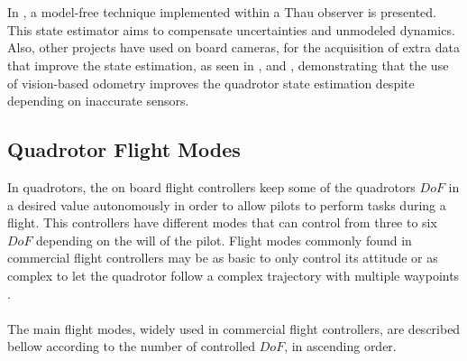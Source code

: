 \\\\
In \cite{AlYounes2015}, a model-free technique implemented within a Thau observer is presented. This state estimator aims to compensate uncertainties and unmodeled dynamics. Also, other projects have used on board cameras, for the acquisition of extra data that improve the state estimation, as seen in \cite{Xie2016}, \cite{Yu2017} and \cite{Liu2017}, demonstrating that the use of vision-based odometry improves the quadrotor state estimation despite depending on inaccurate sensors.

\subsection{Quadrotor Flight Modes}
In quadrotors, the on board flight controllers keep some of the quadrotors $DoF$ in a desired value autonomously in order to allow pilots to perform tasks during a flight. This controllers have different modes that can control from three to six $DoF$ depending on the will of the pilot. Flight modes commonly found in commercial flight controllers may be as basic to only control its attitude or as complex to let the quadrotor follow a complex trajectory with multiple waypoints \cite{Ardupilot2016}.
\\\\
The main flight modes, widely used in commercial flight controllers, are described bellow according to the number of controlled $DoF$, in ascending order.

